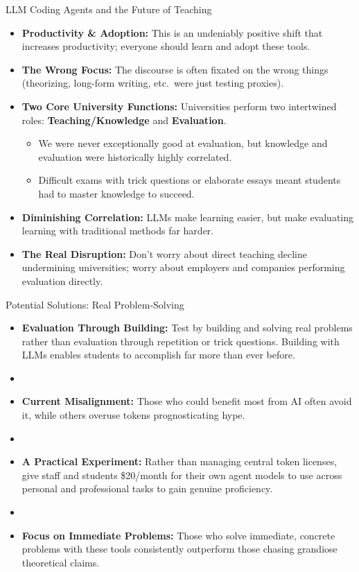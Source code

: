 \documentclass[xcolor=x11names,compress,9pt]{beamer}
\renewcommand{\(}{\begin{columns}}
\renewcommand{\)}{\end{columns}}
\newcommand{\<}[1]{\begin{column}{#1}}
\renewcommand{\>}{\end{column}}
\begin{document}
\begin{frame}{LLM Coding Agents and the Future of Teaching}
    \begin{itemize}
        \item \textbf{Productivity \& Adoption:} This is an undeniably positive shift that increases productivity; everyone should learn and adopt these tools.
        \item \textbf{The Wrong Focus:} The discourse is often fixated on the wrong things (theorizing, long-form writing, etc.\ were just testing proxies).
        \item \textbf{Two Core University Functions:} Universities perform two intertwined roles: \textbf{Teaching/Knowledge} and \textbf{Evaluation}.
        \begin{itemize}
            \item We were never exceptionally good at evaluation, but knowledge and evaluation were historically highly correlated.
            \item Difficult exams with trick questions or elaborate essays meant students had to master knowledge to succeed.
        \end{itemize}
        \item \textbf{Diminishing Correlation:} LLMs make learning easier, but make evaluating learning with traditional methods far harder.
        \item \textbf{The Real Disruption:} Don't worry about direct teaching decline undermining universities; worry about employers and companies performing evaluation directly.
    \end{itemize}
\end{frame}

\begin{frame}{Potential Solutions: Real Problem-Solving}
    \begin{itemize}
        \item \textbf{Evaluation Through Building:} Test by building and solving real problems rather than evaluation through repetition or trick questions. Building with LLMs enables students to accomplish far more than ever before.
        \item []
        \item \textbf{Current Misalignment:} Those who could benefit most from AI often avoid it, while others overuse tokens prognosticating hype.
        \item []
        \item \textbf{A Practical Experiment:} Rather than managing central token licenses, give staff and students \$20/month for their own agent models to use across personal and professional tasks to gain genuine proficiency.
        \item []
        \item \textbf{Focus on Immediate Problems:} Those who solve immediate, concrete problems with these tools consistently outperform those chasing grandiose theoretical claims.
    \end{itemize}
\end{frame}
\end{document}
